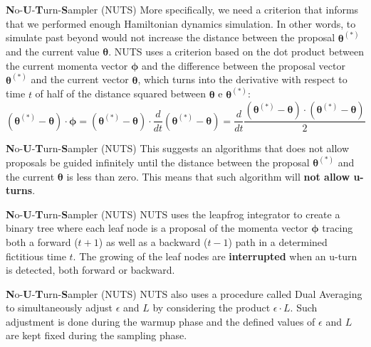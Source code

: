 \begin{frame}{\textbf{N}o-\textbf{U}-\textbf{T}urn-\textbf{S}ampler (NUTS)}
	More specifically, we need a criterion that informs that we performed
	enough Hamiltonian dynamics simulation.
	In other words, to simulate past beyond would not increase the distance
	between the proposal $\boldsymbol{\theta}^{(*)}$ and the current value $\boldsymbol{\theta}$.
	\vfill
	NUTS uses a criterion based on the dot product between the current momenta vector
	$\boldsymbol{\phi}$ and the difference between the proposal vector $\boldsymbol{\theta}^{(*)}$
	and the current vector $\boldsymbol{\theta}$,
	which turns into the derivative with respect to time $t$ of half of the distance squared between
	$\boldsymbol{\theta}$ e $\boldsymbol{\theta}^{(*)}$:
	$$
		(\boldsymbol{\theta}^{(*)} - \boldsymbol{\theta}) \cdot \boldsymbol{\phi}
		= (\boldsymbol{\theta}^{(*)} - \boldsymbol{\theta}) \cdot \frac{d}{dt} (\boldsymbol{\theta}^{(*)} - \boldsymbol{\theta})
		= \frac{d}{dt} \frac{(\boldsymbol{\theta}^{(*)} - \boldsymbol{\theta}) \cdot (\boldsymbol{\theta}^{(*)} - \boldsymbol{\theta})}{2}
	$$
\end{frame}

\begin{frame}{\textbf{N}o-\textbf{U}-\textbf{T}urn-\textbf{S}ampler (NUTS)}
	This suggests an algorithms that does not allow proposals be guided infinitely
	until the distance between the proposal $\boldsymbol{\theta}^{(*)}$ and the current
	$\boldsymbol{\theta}$ is less than zero.
	\vfill
	This means that such algorithm will \textbf{not allow u-turns}.
\end{frame}

\begin{frame}{\textbf{N}o-\textbf{U}-\textbf{T}urn-\textbf{S}ampler (NUTS)}
	NUTS uses the leapfrog integrator to create a binary tree where each leaf node
	is a proposal of the momenta vector $\boldsymbol{\phi}$ tracing both a forward
	($t+1$) as well as a backward ($t-1$) path in a determined fictitious time $t$.
	The growing of the leaf nodes are \textbf{interrupted} when an u-turn is detected,
	both forward or backward.
\end{frame}

\begin{frame}{\textbf{N}o-\textbf{U}-\textbf{T}urn-\textbf{S}ampler (NUTS)}
	NUTS also uses a procedure called Dual Averaging
	\parencite{nesterov2009primal} to simultaneously adjust $\epsilon$ and $L$
	by considering the product $\epsilon \cdot L$.
	\vfill
	Such adjustment is done during the warmup phase and the defined values of
	$\epsilon$ and $L$ are kept fixed during the sampling phase.
\end{frame}

